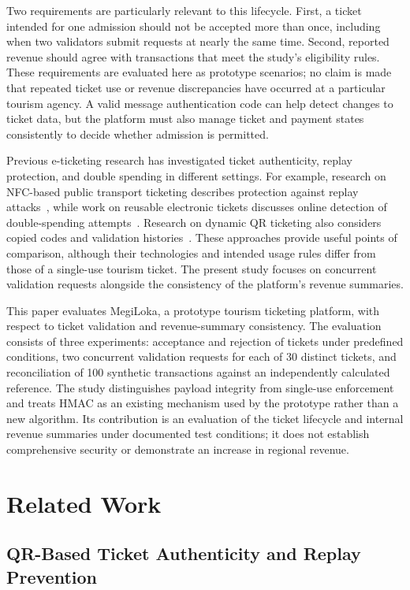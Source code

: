 \documentclass[runningheads]{llncs}
\begin{document}
Two requirements are particularly relevant to this lifecycle. First,
a ticket intended for one admission should not be accepted more than
once, including when two validators submit requests at nearly the
same time. Second, reported revenue should agree with transactions
that meet the study's eligibility rules. These requirements are
evaluated here as prototype scenarios; no claim is made that repeated
ticket use or revenue discrepancies have occurred at a particular
tourism agency. A valid message authentication code can help detect
changes to ticket data, but the platform must also manage ticket and
payment states consistently to decide whether admission is permitted.

Previous e-ticketing research has investigated ticket authenticity,
replay protection, and double spending in different settings. For
example, research on NFC-based public transport ticketing describes
protection against replay attacks~\cite{ref_nfc_ticketing}, while
work on reusable electronic tickets discusses online detection of
double-spending attempts~\cite{ref_reusable_ticket}. Research on
dynamic QR ticketing also considers copied codes and validation
histories~\cite{ref_dynamic_qr}. These approaches provide useful
points of comparison, although their technologies and intended usage
rules differ from those of a single-use tourism ticket. The present
study focuses on concurrent validation requests alongside the
consistency of the platform's revenue summaries.

This paper evaluates MegiLoka, a prototype tourism ticketing platform,
with respect to ticket validation and revenue-summary consistency.
The evaluation consists of three experiments: acceptance and rejection
of tickets under predefined conditions, two concurrent validation
requests for each of 30 distinct tickets, and reconciliation of
100 synthetic transactions against an independently calculated
reference. The study distinguishes payload integrity from single-use
enforcement and treats HMAC as an existing mechanism used by the
prototype rather than a new algorithm. Its contribution is an
evaluation of the ticket lifecycle and internal revenue summaries
under documented test conditions; it does not establish comprehensive
security or demonstrate an increase in regional revenue.

\section{Related Work}

\subsection{QR-Based Ticket Authenticity and Replay Prevention}
\end{document}
